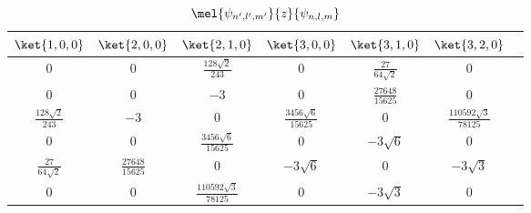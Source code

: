 

\begin{table}[ht]
\centering
\caption{$\mel{\psi_{n',l',m'}}{z}{\psi_{n,l,m}}$}\label{HDipM_tab1}
\begin{tabular}{|c|c|c|c|c|c|c|}
\hline
$\ket{1,0,0}$ & $\ket{2,0,0}$ & $\ket{2,1,0}$ & $\ket{3,0,0}$ & $\ket{3,1,0}$ & $\ket{3,2,0}$\\
\hline
0 & 0 & $\frac{128\sqrt 2}{243}$ & 0 & $\frac{27}{64\sqrt 2}$ & 0 \\
\hline
0 & 0 & $-3$ & 0 & $\frac{27648}{15625}$ & 0 \\
\hline
$\frac{128\sqrt 2}{243}$ & $-3$ & 0 & $\frac{3456\sqrt 6}{15625}$ & 0 & $\frac{110592\sqrt 3}{78125}$ \\
\hline
0 & 0 & $\frac{3456\sqrt 6}{15625}$ & 0 & $-3\sqrt 6$ & 0 \\
\hline
$\frac{27}{64\sqrt 2}$ & $\frac{27648}{15625}$ & 0 & $-3\sqrt 6$ & 0 & $-3 \sqrt 3$ \\
\hline
0 & 0 & $\frac{110592\sqrt 3}{78125}$ & 0 & $-3\sqrt 3$ & 0 \\
\hline
\end{tabular}
\end{table}
